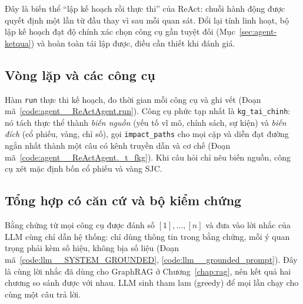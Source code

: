 Đây là biến thể ``lập kế hoạch rồi thực thi'' của ReAct: chuỗi hành động được quyết định một lần từ đầu thay vì sau
mỗi quan sát. Đổi lại tính linh hoạt, bộ lập kế hoạch đạt độ chính xác chọn công cụ gần tuyệt đối
(Mục~\ref{sec:agent-ketqua}) và hoàn toàn tái lập được, điều cần thiết khi đánh giá.



\subsection{Vòng lặp và các công cụ}
Hàm \texttt{run} thực thi kế hoạch, đo thời gian mỗi công cụ và ghi vết (Đoạn mã~\ref{code:agent__ReActAgent.run}).
Công cụ phức tạp nhất là \texttt{kg\_tai\_chinh}: nó tách thực thể thành \emph{biến nguồn} (yếu tố vĩ mô, chính
sách, sự kiện) và \emph{biến đích} (cổ phiếu, vàng, chỉ số), gọi \texttt{impact\_paths} cho mọi cặp và diễn đạt
đường ngắn nhất thành một câu có kênh truyền dẫn và cơ chế (Đoạn mã~\ref{code:agent__ReActAgent._t_fkg}). Khi câu
hỏi chỉ nêu biến nguồn, công cụ xét mặc định bốn cổ phiếu và vàng SJC.



\subsection{Tổng hợp có căn cứ và bộ kiểm chứng}\label{sec:kiemchung-agent}
Bằng chứng từ mọi công cụ được đánh số $[1], \dots, [n]$ và đưa vào lời nhắc của LLM cùng chỉ dẫn hệ thống: chỉ dùng
thông tin trong bằng chứng, mỗi ý quan trọng phải kèm số hiệu, không bịa số liệu
(Đoạn mã~\ref{code:llm__SYSTEM_GROUNDED}, \ref{code:llm__grounded_prompt}). Đây là cùng lời nhắc đã dùng cho
GraphRAG ở Chương~\ref{chap:rag}, nên kết quả hai chương so sánh được với nhau. LLM sinh tham lam (greedy) để mọi lần
chạy cho cùng một câu trả lời.


